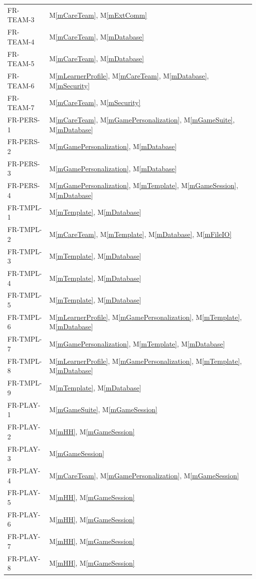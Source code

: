 \documentclass[12pt, titlepage]{article}
\newcommand{\mref}[1]{M\ref{#1}}
\begin{document}
\begin{longtable}{p{} p{}}
FR-TEAM-3 & \mref{mCareTeam}, \mref{mExtComm}\\
FR-TEAM-4 & \mref{mCareTeam}, \mref{mDatabase}\\
FR-TEAM-5 & \mref{mCareTeam}, \mref{mDatabase}\\
FR-TEAM-6 & \mref{mLearnerProfile}, \mref{mCareTeam}, \mref{mDatabase}, \mref{mSecurity}\\
FR-TEAM-7 & \mref{mCareTeam}, \mref{mSecurity}\\
FR-PERS-1 & \mref{mCareTeam}, \mref{mGamePersonalization}, \mref{mGameSuite}, \mref{mDatabase}\\
FR-PERS-2 & \mref{mGamePersonalization}, \mref{mDatabase}\\
FR-PERS-3 & \mref{mGamePersonalization}, \mref{mDatabase}\\
FR-PERS-4 & \mref{mGamePersonalization}, \mref{mTemplate}, \mref{mGameSession}, \mref{mDatabase}\\
FR-TMPL-1 & \mref{mTemplate}, \mref{mDatabase}\\
FR-TMPL-2 & \mref{mCareTeam}, \mref{mTemplate}, \mref{mDatabase}, \mref{mFileIO}\\
FR-TMPL-3 & \mref{mTemplate}, \mref{mDatabase}\\
FR-TMPL-4 & \mref{mTemplate}, \mref{mDatabase}\\
FR-TMPL-5 & \mref{mTemplate}, \mref{mDatabase}\\
FR-TMPL-6 & \mref{mLearnerProfile}, \mref{mGamePersonalization}, \mref{mTemplate}, \mref{mDatabase}\\
FR-TMPL-7 & \mref{mGamePersonalization}, \mref{mTemplate}, \mref{mDatabase}\\
FR-TMPL-8 & \mref{mLearnerProfile}, \mref{mGamePersonalization}, \mref{mTemplate}, \mref{mDatabase}\\
FR-TMPL-9 & \mref{mTemplate}, \mref{mDatabase}\\
FR-PLAY-1 & \mref{mGameSuite}, \mref{mGameSession}\\
FR-PLAY-2 & \mref{mHH}, \mref{mGameSession}\\
FR-PLAY-3 & \mref{mGameSession}\\
FR-PLAY-4 & \mref{mCareTeam}, \mref{mGamePersonalization}, \mref{mGameSession}\\
FR-PLAY-5 & \mref{mHH}, \mref{mGameSession}\\
FR-PLAY-6 & \mref{mHH}, \mref{mGameSession}\\
FR-PLAY-7 & \mref{mHH}, \mref{mGameSession}\\
FR-PLAY-8 & \mref{mHH}, \mref{mGameSession}\\

\end{longtable}
\end{document}
